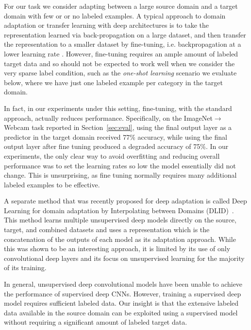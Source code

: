 \label{sec:decaf}
For our task we consider adapting between a large source domain and a target domain with few or or no labeled examples. 
A typical approach to domain adaptation or transfer learning with deep architectures is to take the representation learned via back-propagation on a large dataset, and then transfer the representation to a smaller dataset by fine-tuning, i.e. backpropagation at a lower learning rate \cite{rcnn,zeiler-arxiv-2013}.
However, fine-tuning requires an ample amount of labeled target data and so should not be expected to work well when we consider the very sparse label condition, such as the \textit{one-shot learning} scenario we evaluate below, where we have just one labeled example per category in the target domain.

In fact, in our experiments under this setting, fine-tuning, with the standard approach, actually reduces performance.
Specifically, on the ImageNet$\rightarrow$Webcam task reported in Section~\ref{sec:eval}, using the final output layer as a predictor in the target domain received 77\% accuracy, while using the final output layer after fine tuning produced a degraded accuracy of 75\%. In our experiments, the only clear way to avoid overfitting and reducing overall performance was to set the learning rates so low the model essentially did not change. This is unsurprising, as fine tuning normally requires many additional labeled examples to be effective.

A separate method that was recently proposed for deep adaptation is called Deep Learning for domain adaptation by Interpolating between Domains (DLID)~\cite{ref:dlid}. This method learns multiple unsupervised deep models directly on the source, target, and combined datasets and uses a representation which is the concatenation of the outputs of each model as its adaptation approach. 
While this was shown to be an interesting approach, it is limited by its use of only convolutional deep layers and its focus on unsupervised learning for the majority of its training.

In general, unsupervised deep convolutional models have been unable to achieve the performance of supervised deep CNNs. However, training a supervised deep model requires sufficient labeled data. Our insight is that the extensive labeled data available in the source domain can be exploited using a supervised model without requiring a significant amount of labeled target data.



